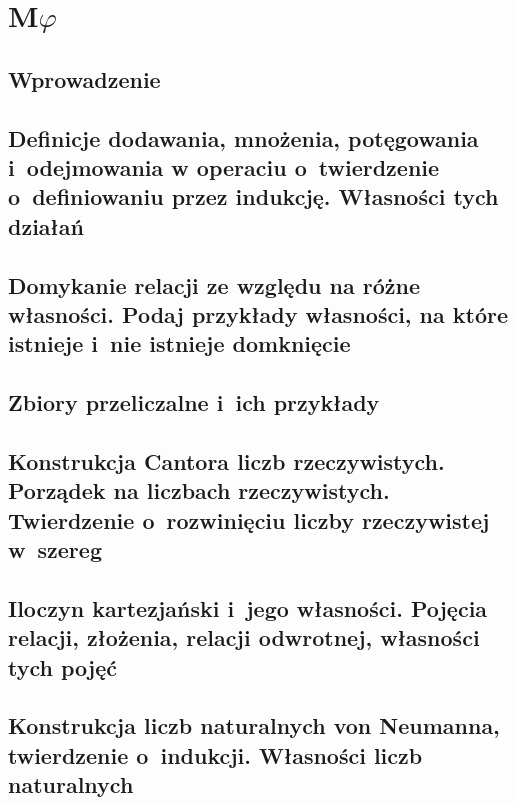 \chapter{\texorpdfstring{M\(\varphi\)}{MFI}}


\section*{Wprowadzenie}


\section{Definicje dodawania, mnożenia, potęgowania i~odejmowania w operaciu o~twierdzenie o~definiowaniu przez indukcję. Własności tych działań}


\section{Domykanie relacji ze względu na różne własności. Podaj przykłady własności, na które istnieje i~nie istnieje domknięcie}


\section{Zbiory przeliczalne i~ich przykłady}


\section{Konstrukcja Cantora liczb rzeczywistych. Porządek na liczbach rzeczywistych. Twierdzenie o~rozwinięciu liczby rzeczywistej w~szereg}


\section{Iloczyn kartezjański i~jego własności. Pojęcia relacji, złożenia, relacji odwrotnej, własności tych pojęć}
\label{mfi:cartesian_and_relations}


\section{Konstrukcja liczb naturalnych von Neumanna, twierdzenie o~indukcji. Własności liczb naturalnych}
\label{mfi:nat_and_induction}


